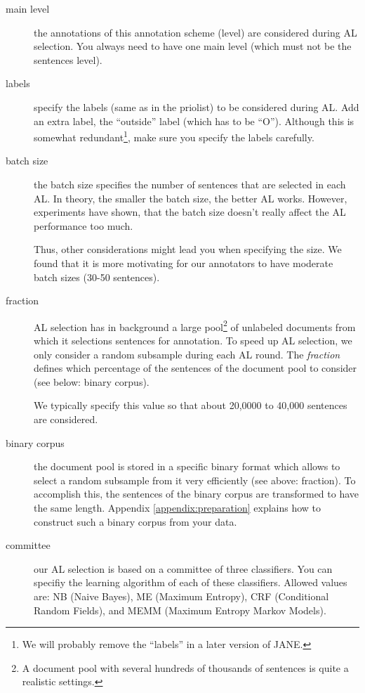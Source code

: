\documentclass[DIV12,english,11pt,halfparskip]{scrartcl}
\begin{document}
\begin{appendix}
\begin{description}
\item[main level] the annotations of this annotation scheme (level)
  are considered during AL selection. You always need to have one main
  level (which must not be the sentences level).
\item[labels] specify the labels (same as in the priolist) to be
  considered during AL. Add an extra label, the ``outside'' label
  (which has to be ``O''). Although this is somewhat
  redundant\footnote{We will probably remove the ``labels'' in a later
    version of JANE.}, make sure you specify the labels carefully.
\item[batch size] the batch size specifies the number of sentences
  that are selected in each AL. In theory, the smaller the batch size,
  the better AL works. However, experiments have shown, that the batch
  size doesn't really affect the AL performance too much. 

  Thus, other considerations might lead you when specifying the size.
  We found that it is more motivating for our annotators to have
  moderate batch sizes (30-50 sentences).

\item[fraction] AL selection has in background a large pool\footnote{A
    document pool with several hundreds of thousands of sentences is
    quite a realistic settings.} of unlabeled documents from which it
  selections sentences for annotation. To speed up AL selection, we
  only consider a random subsample during each AL round. The
  \emph{fraction} defines which percentage of the sentences of the
  document pool to consider (see below: binary corpus).

  We typically specify this value so that about 20,0000 to 40,000
  sentences are considered.

\item[binary corpus] the document pool is stored in a specific binary
  format which allows to select a random subsample from it very
  efficiently (see above: fraction). To accomplish this, the sentences
  of the binary corpus are transformed to have the same length.
  Appendix \ref{appendix:preparation} explains how to construct such a
  binary corpus from your data.

\item[committee] our AL selection is based on a committee of three
  classifiers. You can specifiy the learning algorithm of each of
  these classifiers. Allowed values are: NB (Naive Bayes), ME (Maximum
  Entropy), CRF (Conditional Random Fields), and MEMM (Maximum Entropy
  Markov Models). 


\end{description}
\end{appendix}
\end{document}
